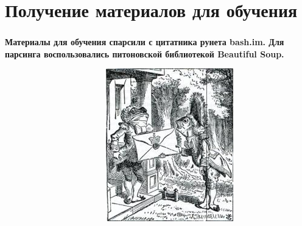 \documentclass[t]{beamer}
\begin{document}
	
	\section{Получение материалов для обучения}
	\begin{frame}
		\frametitle{\insertsection}
		\textbf{Материалы для обучения спарсили с цитатника рунета bash.im. Для парсинга воспользовались питоновской библиотекой Beautiful Soup. \newline}
        
        ~~~~~~~~~~~~~~~~~~~~~~~ {\includegraphics[scale = 0.6]{images/beautiful_soup.jpg}}
	\end{frame}
	
	
\end{document}
